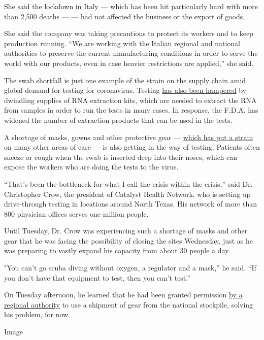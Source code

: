 She said the lockdown in Italy --- which has been hit particularly hard
with more than 2,500 deaths --- --- had not affected the business or the
export of goods.

She said the company was taking precautions to protect its workers and
to keep production running. ``We are working with the Italian regional
and national authorities to preserve the current manufacturing
conditions in order to serve the world with our products, even in case
heavier restrictions are applied,'' she said.

The swab shortfall is just one example of the strain on the supply chain
amid global demand for testing for coronavirus. Testing
\href{https://www.nytimes3xbfgragh.onion/2020/03/11/health/coronavirus-testing-shortages.html}{has
also been hampered} by dwindling supplies of RNA extraction kits, which
are needed to extract the RNA from samples in order to run the tests in
many cases. In response, the F.D.A. has widened the number of extraction
products that can be used in the tests.

A shortage of masks, gowns and other protective gear ---
\href{https://www.nytimes3xbfgragh.onion/2020/03/09/health/coronavirus-n95-face-masks.html}{which
has put a strain} on many other areas of care --- is also getting in the
way of testing. Patients often sneeze or cough when the swab is inserted
deep into their noses, which can expose the workers who are doing the
tests to the virus.

``That's been the bottleneck for what I call the crisis within the
crisis,'' said Dr. Christopher Crow, the president of Catalyst Health
Network, who is setting up drive-through testing in locations around
North Texas. His network of more than 800 physician offices serves one
million people.

Until Tuesday, Dr. Crow was experiencing such a shortage of masks and
other gear that he was facing the possibility of closing the sites
Wednesday, just as he was preparing to vastly expand his capacity from
about 30 people a day.

"You can't go scuba diving without oxygen, a regulator and a mask,'' he
said. ``If you don't have that equipment to test, then you can't test.''

On Tuesday afternoon, he learned that he had been granted permission
\href{https://ncttrac.org/}{by a regional authority} to use a shipment
of gear from the national stockpile, solving his problem, for now.

Image

